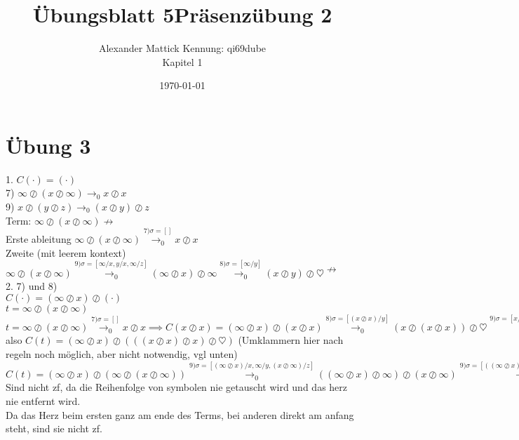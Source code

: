 \documentclass{article}
\title{Übungsblatt 5}
\author{
Alexander Mattick Kennung: qi69dube\\
Kapitel 1
}
\date{\today}
\title{Präsenzübung 2}
\newcommand{\nto}{\nrightarrow}
\begin{document}
	\maketitle\noindent
	\section{Übung 3}
	1. $C(\cdot )=(\cdot)$\\
	7) $\infty \oslash (x\oslash\infty)\to_0 x\oslash x$\\
	9) $x \oslash (y\oslash z)\to_0 (x \oslash y)\oslash z$\\
	Term: $\infty \oslash (x\oslash\infty)\nto$\\
	Erste ableitung $\infty \oslash (x\oslash\infty)\stackrel{7)\sigma=[]}{\to_0} x\oslash x$\\
	Zweite (mit leerem kontext) $\infty \oslash (x\oslash\infty)\stackrel{9) \sigma=[\infty/x,y/x,\infty/z]}{\to_0} (\infty \oslash x)\oslash\infty\stackrel{8) \sigma=[\infty/y]}{\to_0} (x\oslash y)\oslash \heartsuit\nto$\\
	2. 7) und 8)\\
	$C(\cdot) = (\infty\oslash x)\oslash (\cdot)$\\
	$t=\infty\oslash (x\oslash \infty)$\\
	$t= \infty\oslash (x\oslash \infty) \stackrel{7) \sigma=[]}{\to_0} x\oslash x\implies C(x\oslash x)= (\infty\oslash x)\oslash (x\oslash x)\stackrel{8) \sigma=[(x\oslash x)/y]}{\to_0} (x\oslash (x\oslash x))\oslash \heartsuit\stackrel{9) \sigma=[x/y,x/z] C(\cdot) = x\oslash\heartsuit}{\to_0} ((x\oslash x)\oslash x)\oslash \heartsuit\nto$\\
	also $C(t)= (\infty\oslash x)\oslash (((x\oslash x)\oslash x)\oslash \heartsuit)$ (Umklammern hier nach regeln noch möglich, aber nicht notwendig, vgl unten)\\
	$C(t) =(\infty\oslash x)\oslash (\infty\oslash (x\oslash \infty)) \stackrel{9) \sigma = [(\infty\oslash x)/x,\infty/y,(x\oslash \infty)/z]}{\to_0} ((\infty\oslash x)\oslash \infty)\oslash (x\oslash \infty)\stackrel{9) \sigma = [((\infty\oslash x)\oslash \infty)/x,x/y,\infty/z]}{\to_0}(((\infty\oslash x)\oslash \infty)\oslash x)\oslash \infty\stackrel{8) \sigma=[\infty/y], C(\cdot)=((\cdot)\oslash x)\oslash \infty}{\to_0} (((x\oslash\infty)\oslash\heartsuit)\oslash x)\oslash \infty\nto$\\
	Sind nicht zf, da die Reihenfolge von symbolen nie getauscht wird und das herz nie entfernt wird.\\
	Da das Herz beim ersten ganz am ende des Terms, bei anderen direkt am anfang steht, sind sie nicht zf.\\
\end{document}
